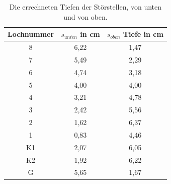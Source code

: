\begin{table}[h]
    \centering
    \caption{Die errechneten Tiefen der Störstellen, von unten und von oben.}
    \begin{tabular}{ccc}
      \toprule
      {Lochnummer} & 
      {$s_{unten}$ in cm} &
      {$s_{oben}$ Tiefe in cm} \\
      \midrule
      8  &  6,22  & 1,47  \\
      7  &  5,49  & 2,29  \\
      6  &  4,74  & 3,18  \\
      5  &  4,00  & 4,00  \\
      4  &  3,21  & 4,78  \\
      3  &  2,42  & 5,56  \\
      2  &  1,62  & 6,37  \\
      1  &  0,83  & 4,46  \\
      K1 &  2,07  & 6,05  \\
      K2 &  1,92  & 6,22  \\   
      G  &  5,65  & 1,67  \\
      \bottomrule
    \end{tabular}
 \label{tab:tiefe}
\end{table}
\noindent


